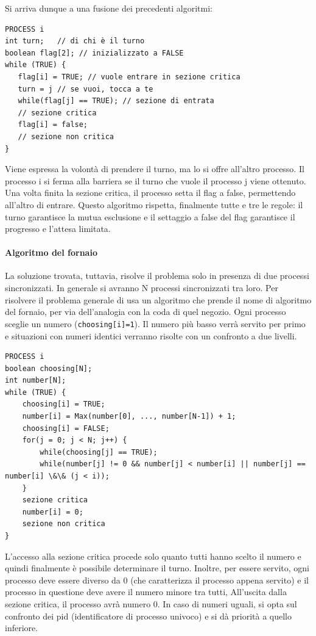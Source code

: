 \documentclass[a4paper]{article}
\begin{document}
Si arriva dunque a una fusione dei precedenti algoritmi:
\begin{verbatim}
PROCESS i
int turn;   // di chi è il turno
boolean flag[2]; // inizializzato a FALSE
while (TRUE) {
   flag[i] = TRUE; // vuole entrare in sezione critica
   turn = j // se vuoi, tocca a te
   while(flag[j] == TRUE); // sezione di entrata
   // sezione critica
   flag[i] = false;
   // sezione non critica
}
\end{verbatim}
Viene espressa la volontà di prendere il turno, ma lo si offre all'altro processo. Il processo i si ferma alla barriera se il turno che vuole il processo j viene ottenuto. Una volta finita la sezione critica, il processo setta il flag a false, permettendo all'altro di entrare. Questo algoritmo rispetta, finalmente tutte e tre le regole: il turno garantisce la mutua esclusione e il settaggio a false del flag garantisce il progresso e l'attesa limitata.

\paragraph{Algoritmo del fornaio}
La soluzione trovata, tuttavia, risolve il problema solo in presenza di due processi sincronizzati. In generale si avranno N processi sincronizzati tra loro. Per risolvere il problema generale di usa un algoritmo che prende il nome di algoritmo del fornaio, per via dell'analogia con la coda di quel negozio. Ogni processo sceglie un numero (\texttt{choosing[i]=1}). Il numero più basso verrà servito per primo e situazioni con numeri identici verranno risolte con un confronto a due livelli.

\begin{verbatim}
PROCESS i
boolean choosing[N];
int number[N];
while (TRUE) {
    choosing[i] = TRUE;
    number[i] = Max(number[0], ..., number[N-1]) + 1;
    choosing[i] = FALSE;
    for(j = 0; j < N; j++) {
        while(choosing[j] == TRUE);
        while(number[j] != 0 && number[j] < number[i] || number[j] == number[i] \&\& (j < i));
    }
    sezione critica
    number[i] = 0;
    sezione non critica
}
\end{verbatim}
L'accesso alla sezione critica procede solo quanto tutti hanno scelto il numero e quindi finalmente è possibile determinare il turno. Inoltre, per essere servito, ogni processo deve essere diverso da 0 (che caratterizza il processo appena servito) e il processo in questione deve avere il numero minore tra tutti, All'uscita dalla sezione critica, il processo avrà numero 0. In caso di numeri uguali, si opta sul confronto dei pid (identificatore di processo univoco) e si dà priorità a quello inferiore.
\end{document}
